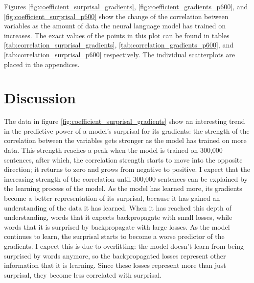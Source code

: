 \documentclass{IEEEtran}
\begin{document}
Figures \ref{fig:coefficient_surprisal_gradients}, \ref{fig:coefficient_gradients_p600}, and \ref{fig:coefficient_surprisal_p600} show the change of the correlation between variables as the amount of data the neural language model has trained on increases.
The exact values of the points in this plot can be found in tables \ref{tab:correlation_surprisal_gradients}, \ref{tab:correlation_gradients_p600}, and \ref{tab:correlation_surprisal_p600} respectively.
The individual scatterplots are placed in the appendices.

\section{Discussion}
The data in figure \ref{fig:coefficient_surprisal_gradients} show an interesting trend in the predictive power of a model's surprisal for its gradients: the strength of the correlation between the variables gets stronger as the model has trained on more data.
This strength reaches a peak when the model is trained on 300,000 sentences, after which, the correlation strength starts to move into the opposite direction; it returns to zero and grows from negative to positive.
I expect that the increasing strength of the correlation until 300,000 sentences can be explained by the learning process of the model.
As the model has learned more, its gradients become a better representation of its surprisal, because it has gained an understanding of the data it has learned.
When it has reached this depth of understanding, words that it expects backpropagate with small losses, while words that it is surprised by backpropagate with large losses.
As the model continues to learn, the surprisal starts to become a worse predictor of the gradients.
I expect this is due to overfitting: the model doesn't learn from being surprised by words anymore, so the backpropagated losses represent other information that it is learning.
Since these losses represent more than just surprisal, they become less correlated with surprisal.
\end{document}
